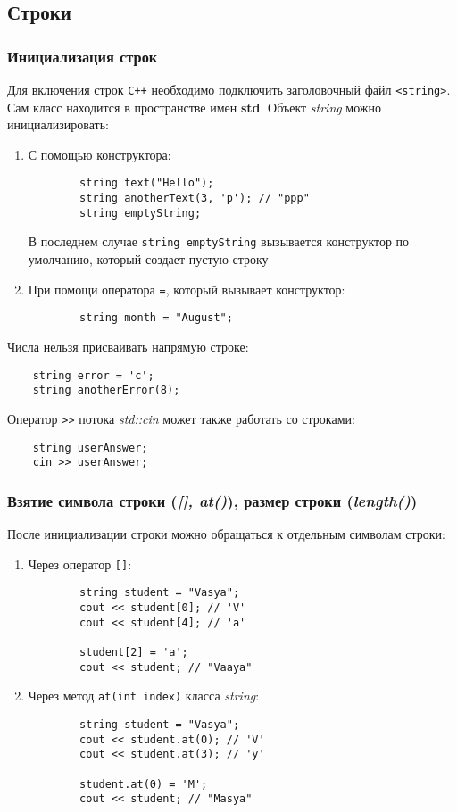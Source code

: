 \subsection{Строки}
\subsubsection{Инициализация строк}
Для включения строк \texttt{C++} необходимо подключить заголовочный файл \lstinline{<string>}. Сам класс находится в пространстве имен \textbf{std}. Объект \textit{string} можно инициализировать:

\begin{enumerate}
    \item С помощью конструктора:
    \begin{lstlisting}
        string text("Hello");
        string anotherText(3, 'p'); // "ppp"
        string emptyString;
    \end{lstlisting}

    В последнем случае \lstinline{string emptyString} вызывается конструктор по умолчанию, который создает пустую строку
    \item При помощи оператора \lstinline{=}, который вызывает конструктор:
    \begin{lstlisting}
        string month = "August";
    \end{lstlisting}
\end{enumerate}

Числа нельзя присваивать напрямую строке:
\begin{lstlisting}
    string error = 'c';
    string anotherError(8);
\end{lstlisting}

Оператор \lstinline{>>} потока \textit{std::cin} может также работать со строками:
\begin{lstlisting}
    string userAnswer;
    cin >> userAnswer;
\end{lstlisting}

\subsubsection{Взятие символа строки (\textit{[], at()}), размер строки (\textit{length()})}
После инициализации строки можно обращаться к отдельным символам строки:
\begin{enumerate}
    \item Через оператор \lstinline{[]}:
    \begin{lstlisting}
        string student = "Vasya";
        cout << student[0]; // 'V'
        cout << student[4]; // 'a'

        student[2] = 'a';
        cout << student; // "Vaaya"
    \end{lstlisting}
    \item Через метод \lstinline{at(int index)} класса \textit{string}:
    \begin{lstlisting}
        string student = "Vasya";
        cout << student.at(0); // 'V'
        cout << student.at(3); // 'y'

        student.at(0) = 'M';
        cout << student; // "Masya"
    \end{lstlisting}
\end{enumerate}

